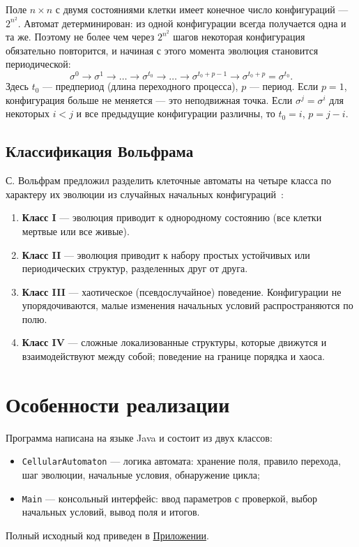 \documentclass[a4paper,14pt]{extarticle}
\begin{document}
Поле $n \times n$ с двумя состояниями клетки имеет конечное число конфигураций --- $2^{n^2}$. Автомат детерминирован: из одной конфигурации всегда получается одна и та же. Поэтому не более чем через $2^{n^2}$ шагов некоторая конфигурация обязательно повторится, и начиная с этого момента эволюция становится периодической:
\[
	\sigma^0 \to \sigma^1 \to \dots \to \sigma^{t_0} \to \dots \to \sigma^{t_0 + p - 1} \to \sigma^{t_0 + p} = \sigma^{t_0}.
\]
Здесь $t_0$ --- предпериод (длина переходного процесса), $p$ --- период. Если $p = 1$, конфигурация больше не меняется --- это неподвижная точка. Если $\sigma^j = \sigma^i$ для некоторых $i < j$ и все предыдущие конфигурации различны, то $t_0 = i$, $p = j - i$.

\subsection{Классификация Вольфрама}

С. Вольфрам предложил разделить клеточные автоматы на четыре класса по характеру их эволюции из случайных начальных конфигураций~\cite{wolfram1984}:
\begin{enumerate}
	\item \textbf{Класс I} --- эволюция приводит к однородному состоянию (все клетки мертвые или все живые).
	\item \textbf{Класс II} --- эволюция приводит к набору простых устойчивых или периодических структур, разделенных друг от друга.
	\item \textbf{Класс III} --- хаотическое (псевдослучайное) поведение. Конфигурации не упорядочиваются, малые изменения начальных условий распространяются по полю.
	\item \textbf{Класс IV} --- сложные локализованные структуры, которые движутся и взаимодействуют между собой; поведение на границе порядка и хаоса.
\end{enumerate}

\newpage
\section{Особенности реализации}
\label{sec:impl}

Программа написана на языке Java и состоит из двух классов:
\begin{itemize}
	\item \texttt{CellularAutomaton} --- логика автомата: хранение поля, правило перехода, шаг эволюции, начальные условия, обнаружение цикла;
	\item \texttt{Main} --- консольный интерфейс: ввод параметров с проверкой, выбор начальных условий, вывод поля и итогов.
\end{itemize}
Полный исходный код приведен в \hyperref[app:code]{Приложении}.
\end{document}
